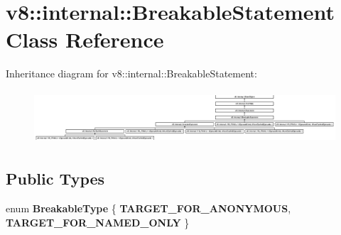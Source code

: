 \hypertarget{classv8_1_1internal_1_1_breakable_statement}{}\section{v8\+:\+:internal\+:\+:Breakable\+Statement Class Reference}
\label{classv8_1_1internal_1_1_breakable_statement}
Inheritance diagram for v8\+:\+:internal\+:\+:Breakable\+Statement\+:\begin{figure}[H]
\begin{center}
\leavevmode
\includegraphics[height=2.000000cm]{classv8_1_1internal_1_1_breakable_statement}
\end{center}
\end{figure}
\subsection*{Public Types}
\begin{DoxyCompactItemize}
\item 
\hypertarget{classv8_1_1internal_1_1_breakable_statement_a52c50b4c3f6fd7f2ee085a03d6ab0f5d}{}enum {\bfseries Breakable\+Type} \{ {\bfseries T\+A\+R\+G\+E\+T\+\_\+\+F\+O\+R\+\_\+\+A\+N\+O\+N\+Y\+M\+O\+U\+S}, 
{\bfseries T\+A\+R\+G\+E\+T\+\_\+\+F\+O\+R\+\_\+\+N\+A\+M\+E\+D\+\_\+\+O\+N\+L\+Y}
 \}\label{classv8_1_1internal_1_1_breakable_statement_a52c50b4c3f6fd7f2ee085a03d6ab0f5d}

\end{DoxyCompactItemize}
